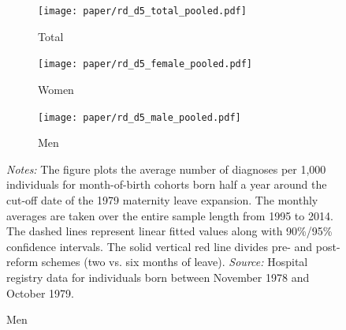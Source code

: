 \documentclass[11pt, a4paper]{article} %
\begin{document}
\begin{landscape}
	\vspace*{\fill}
	\begin{figure}
		[H]\centering
		\caption{Reduced form for mental \& behavioral disorders (pooled)}\label{fig: rf_d5_pooled}
		\begin{subfigure}[h]{0.31\linewidth}\centering\caption{Total}
		\texttt{[image: paper/rd\_d5\_total\_pooled.pdf]}
		\end{subfigure}
		\begin{subfigure}[h]{0.31\linewidth}\centering\caption{Women}
		\texttt{[image: paper/rd\_d5\_female\_pooled.pdf]}
		\end{subfigure}
		\begin{subfigure}[h]{0.31\linewidth}\centering\caption{Men}
		\texttt{[image: paper/rd\_d5\_male\_pooled.pdf]}
		\end{subfigure}
			\scriptsize
			\begin{minipage}{0.95\linewidth}
				\emph{Notes:} The figure plots the average number of diagnoses per 1,000 individuals for month-of-birth cohorts born half a year around the cut-off date of the 1979 maternity leave expansion. The monthly averages are taken over the entire sample length from 1995 to 2014. The dashed lines represent linear fitted values along with 90\%/95\% confidence intervals. The solid vertical red line divides pre- and post-reform schemes (two vs. six months of leave).\newline
				\emph{Source:} Hospital registry data for individuals born between November 1978 and October 1979.
			\end{minipage}
	\end{figure}
	\vspace*{\fill}\clearpage
\end{landscape}
\end{document}
